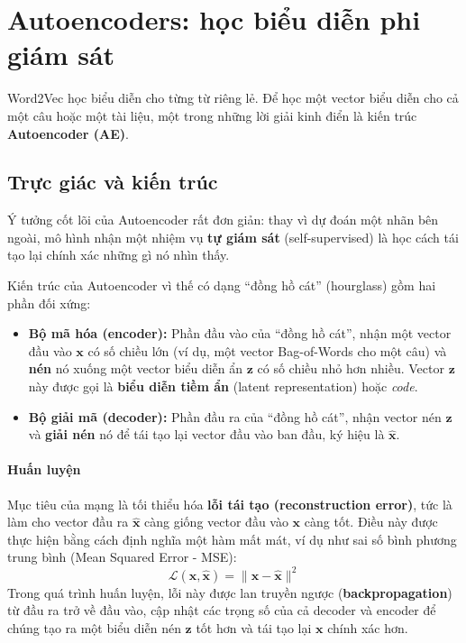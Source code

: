 
\section{Autoencoders: học biểu diễn phi giám sát}
\label{ssec:autoencoders}

Word2Vec học biểu diễn cho từng từ riêng lẻ. Để học một vector biểu diễn cho cả một câu hoặc một tài liệu, một trong những lời giải kinh điển là kiến trúc \textbf{Autoencoder (AE)}.

\subsection{Trực giác và kiến trúc}

Ý tưởng cốt lõi của Autoencoder rất đơn giản: thay vì dự đoán một nhãn bên ngoài, mô hình nhận một nhiệm vụ \textbf{tự giám sát} (self-supervised) là học cách tái tạo lại chính xác những gì nó nhìn thấy.

Kiến trúc của Autoencoder vì thế có dạng “đồng hồ cát” (hourglass) gồm hai phần đối xứng:

\begin{itemize}
    \item \textbf{Bộ mã hóa (encoder):} Phần đầu vào của “đồng hồ cát”, nhận một vector đầu vào $\mathbf{x}$ có số chiều lớn (ví dụ, một vector Bag-of-Words cho một câu) và \textbf{nén} nó xuống một vector biểu diễn ẩn $\mathbf{z}$ có số chiều nhỏ hơn nhiều. Vector $\mathbf{z}$ này được gọi là \textbf{biểu diễn tiềm ẩn} (latent representation) hoặc \textit{code}.
    \item \textbf{Bộ giải mã (decoder):} Phần đầu ra của “đồng hồ cát”, nhận vector nén $\mathbf{z}$ và \textbf{giải nén} nó để tái tạo lại vector đầu vào ban đầu, ký hiệu là $\hat{\mathbf{x}}$.
\end{itemize}

\paragraph{Huấn luyện}
Mục tiêu của mạng là tối thiểu hóa \textbf{lỗi tái tạo (reconstruction error)}, tức là làm cho vector đầu ra $\hat{\mathbf{x}}$ càng giống vector đầu vào $\mathbf{x}$ càng tốt. Điều này được thực hiện bằng cách định nghĩa một hàm mất mát, ví dụ như sai số bình phương trung bình (Mean Squared Error - MSE):
$$ \mathcal{L}(\mathbf{x}, \hat{\mathbf{x}}) = \|\mathbf{x} - \hat{\mathbf{x}}\|^2 $$
Trong quá trình huấn luyện, lỗi này được lan truyền ngược (\textbf{backpropagation}) từ đầu ra trở về đầu vào, cập nhật các trọng số của cả decoder và encoder để chúng tạo ra một biểu diễn nén $\mathbf{z}$ tốt hơn và tái tạo lại $\mathbf{x}$ chính xác hơn.

